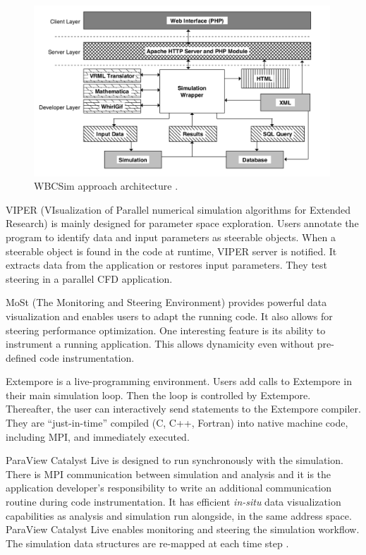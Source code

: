 \begin{figure}[H]
    \centering
    \includegraphics[width=420px,keepaspectratio]{img/media/image19.png}
    \caption{WBCSim approach architecture
\cite{Goel1999WBCSim:,Shu2011Computational,Shu2006WBCSim:}.}
    \label{fig:fig3_8}
\end{figure}

VIPER (VIsualization of Parallel numerical simulation algorithms for
Extended Research) \cite{Rathmayer1997tool}
is mainly designed for parameter space exploration. Users annotate the
program to identify data and input parameters as steerable objects. When
a steerable object is found in the code at runtime, VIPER server is
notified. It extracts data from the application or restores input
parameters. They test steering in a parallel CFD application.

MoSt (The Monitoring and Steering Environment)
\cite{Glasner2001Monitoring}
provides powerful data visualization and enables users to adapt the
running code. It also allows for steering performance optimization. One
interesting feature is its ability to instrument a running application.
This allows dynamicity even without pre-defined code instrumentation.

Extempore \cite{Swift2015Live}
is a live-programming environment. Users add calls to Extempore in their
main simulation loop. Then the loop is controlled by Extempore.
Thereafter, the user can interactively send statements to the Extempore
compiler. They are ``just-in-time'' compiled (C, C++, Fortran) into
native machine code, including MPI, and immediately executed.

ParaView Catalyst Live \cite{Ayachit2015ParaView}
is designed to run synchronously with the simulation. There is MPI
communication between simulation and analysis and it is the application
developer's responsibility to write an additional communication routine
during code instrumentation. It has efficient \textit{in-situ} data
visualization capabilities as analysis and simulation run alongside, in
the same address space. ParaView Catalyst Live enables monitoring and
steering the simulation workflow. The simulation data structures are
re-mapped at each time step \cite{Bauer2016In}.

